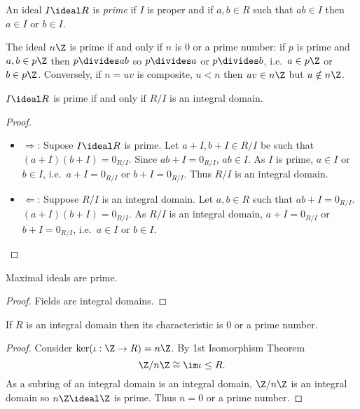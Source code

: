 \documentclass[a4paper]{article}
\theoremstyle{definition}
\begin{document}
\begin{definition}
  An ideal \(I \ideal R\) is \emph{prime} if \(I\) is proper and if \(a, b \in R\) such that \(ab \in I\) then \(a \in I\) or \(b \in I\).
\end{definition}

\begin{eg}
  The ideal \(n\Z\) is prime if and only if \(n\) is \(0\) or a prime number: if \(p\) is prime and \(a, b \in p\Z\) then \(p \divides ab\) so \(p \divides a\) or \(p \divides b\), i.e.\ \(a \in p\Z\) or \(b \in p\Z\). Conversely, if \(n = uv\) is composite, \(u < n\) then \(uv \in n\Z\) but \(u \notin n\Z\).
\end{eg}

\begin{lemma}
  \(I \ideal R\) is prime if and only if \(R/I\) is an integral domain.
\end{lemma}

\begin{proof}\leavevmode
  \begin{itemize}
  \item \(\Rightarrow\): Supose \(I \ideal R\) is prime. Let \(a + I, b + I \in R/I\) be such that \((a + I)(b + I) = 0_{R/I}\). Since \(ab + I = 0_{R/I}\), \(ab \in I\). As \(I\) is prime, \(a \in I\) or \(b \in I\), i.e.\ \(a + I = 0_{R/I}\) or \(b + I = 0_{R/I}\). Thus \(R/I\) is an integral domain.
  \item \(\Leftarrow\): Suppose \(R/I\) is an integral domain. Let \(a, b \in R\) such that \(ab + I = 0_{R/I}\). \((a + I)(b + I) = 0_{R/I}\). As \(R/I\) is an integral domain, \(a + I = 0_{R/I}\) or \(b + I = 0_{R/I}\), i.e.\ \(a \in I\) or \(b \in I\).
  \end{itemize}
\end{proof}

\begin{corollary}
  Maximal ideals are prime.
\end{corollary}

\begin{proof}
  Fields are integral domains.
\end{proof}

\begin{lemma}
  If \(R\) is an integral domain then its characteristic is \(0\) or a prime number.
\end{lemma}

\begin{proof}
  Consider \(\ker (\iota: \Z \to R) = n\Z\). By 1st Isomorphism Theorem
  \[
    \Z/n\Z \cong \im \iota \leq R.
  \]
  As a subring of an integral domain is an integral domain, \(\Z/n\Z\) is an integral domain so \(n\Z \ideal \Z\) is prime. Thus \(n = 0\) or a prime number.
\end{proof}
\end{document}
